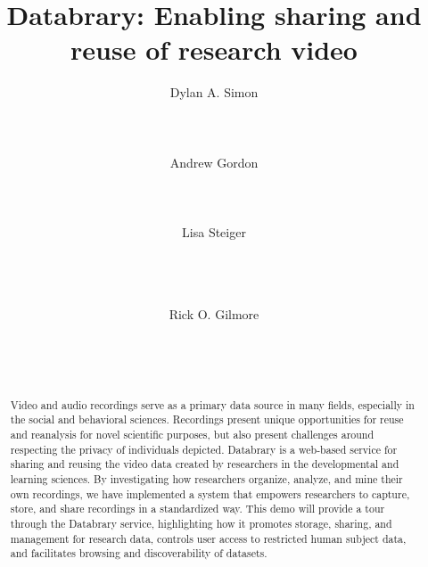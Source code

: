 \documentclass{sig-alternate}
\begin{document}

\title{Databrary: Enabling sharing and reuse of research video}


\author{
\alignauthor
Dylan A. Simon\\
	\\
	\\
	\\
\alignauthor
Andrew Gordon\\
	\\
	\\
	\\
\alignauthor
Lisa Steiger\\
	\\
	\\
	\\
\and
Rick O. Gilmore\\
	\\
	\\
	\\
}

\maketitle

\begin{abstract}
Video and audio recordings serve as a primary data source in many fields, especially in the social and behavioral sciences.
Recordings present unique opportunities for reuse and reanalysis for novel scientific purposes, but also present challenges around respecting the privacy of individuals depicted.
Databrary is a web-based service for sharing and reusing the video data created by researchers in the developmental and learning sciences.
By investigating how researchers organize, analyze, and mine their own recordings, we have implemented a system that empowers researchers to capture, store, and share recordings in a standardized way.
This demo will provide a tour through the Databrary service, highlighting how it promotes storage, sharing, and management for research data, controls user access to restricted human subject data, and facilitates browsing and discoverability of datasets.
\end{abstract}
\end{document}
